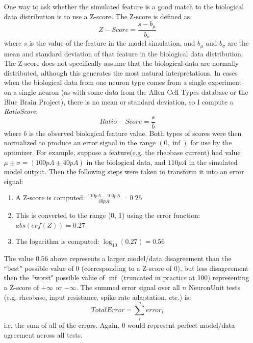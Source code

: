 One way to ask whether the simulated feature is a good match to the biological data distribution is to use a Z-score.
The Z-score is defined as:
\begin{equation}
Z-Score = \frac{s - b_{\mu}}{b_{\sigma}}
\end{equation}
where $s$ is the value of the feature in the model simulation, and $b_{\mu}$ and $b_{\sigma}$ are the mean and standard deviation of that feature in the biological data distribution.
The Z-score does not specifically assume that the biological data are normally distributed, although this generates the most natural interpretations.
In cases when the biological data from one neuron type comes from a single experiment on a single neuron (as with some data from the Allen Cell Types database or the Blue Brain Project), there is no mean or standard deviation, so I compute a \emph{RatioScore}:
\begin{equation}
Ratio-Score = \frac{s}{b}
\end{equation}%
where $b$ is the observed biological feature value.
Both types of scores were then normalized to produce an error signal in the range $(0, \inf)$ for use by the optimizer.
For example, suppose a feature(e.g. the rheobase current) had value $\mu \pm \sigma = (100pA \pm 40pA)$ in the biological data, and $110 pA$ in the simulated model output.
Then the following steps were taken to transform it into an error signal:
\begin{enumerate}
 \item A Z-score is computed: $\frac{110 pA - 100 pA}{40 pA} = 0.25$
 \item This is converted to the range (0, 1) using the error function: $abs(erf(Z)) = 0.27$ 
 \item The logarithm is computed: $\log_{10}(0.27) = 0.56$ 
\end{enumerate}
The value 0.56 above represents a larger model/data disagreement than the ``best" possible value of 0 (corresponding to a Z-score of 0), but less disagreement then the ``worst" possible value of $\inf$ (truncated in practice at 100) representing a Z-score of $+\infty$ or $-\infty$. The summed error signal over all $n$ NeuronUnit tests (e.g. rheobase, input resistance, spike rate adaptation, etc.) is:
\begin{equation}
Total  Error = \sum_i^n error_i
\end{equation}
i.e. the sum of all of the errors.  Again, 0 would represent perfect model/data agreement across all tests.

